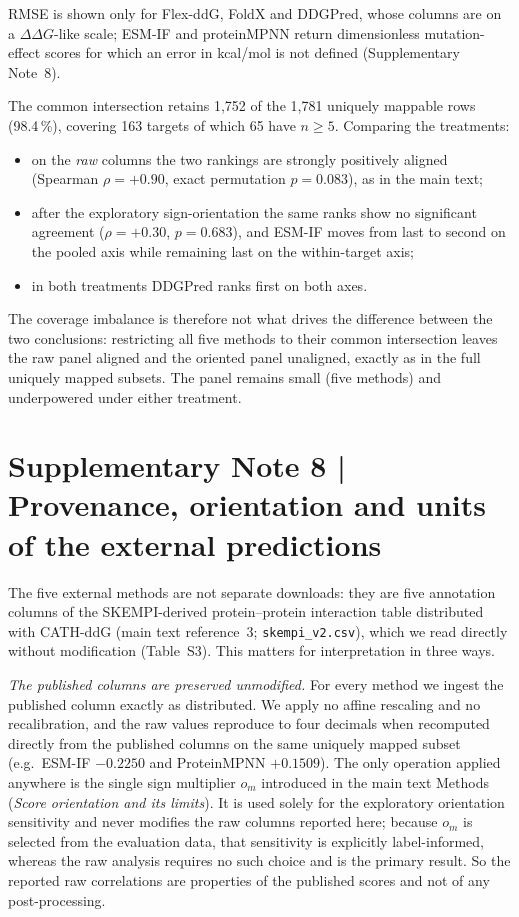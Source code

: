 \documentclass[11pt,a4paper]{article}
\begin{document}
RMSE is shown only for Flex-ddG, FoldX and DDGPred, whose columns are on a $\Delta\Delta G$-like
scale; ESM-IF and proteinMPNN return dimensionless mutation-effect scores for which an error in
kcal/mol is not defined (Supplementary Note~8).

The common intersection retains 1,752 of the 1{,}781 uniquely mappable rows (98.4\,\%),
covering 163 targets of which 65 have $n \geq 5$. Comparing the treatments:

\begin{itemize}
  \item on the \emph{raw} columns the two rankings are strongly positively aligned
        (Spearman $\rho = +0.90$, exact permutation $p = 0.083$), as in the main text;
  \item after the exploratory sign-orientation the same ranks show no significant agreement
        ($\rho = +0.30$, $p = 0.683$), and ESM-IF moves from last to second on the
        pooled axis while remaining last on the within-target axis;
  \item in both treatments DDGPred ranks first on both axes.
\end{itemize}

The coverage imbalance is therefore not what drives the difference between the two conclusions:
restricting all five methods to their common intersection leaves the raw panel aligned and the
oriented panel unaligned, exactly as in the full uniquely mapped subsets. The panel remains small
(five methods) and underpowered under either treatment.

\section*{Supplementary Note 8 | Provenance, orientation and units of the external predictions}
The five external methods are not separate downloads: they are five annotation columns of the
SKEMPI-derived protein--protein interaction table distributed with CATH-ddG (main text
reference~3; \texttt{skempi\_v2.csv}), which we read directly without modification
(Table~S3). This matters for interpretation in three ways.

\emph{The published columns are preserved unmodified.} For every method we ingest the
published column exactly as distributed. We apply no affine rescaling and no recalibration,
and the raw values reproduce to four decimals when recomputed directly from the published
columns on the same uniquely mapped subset (e.g.\ ESM-IF $-0.2250$ and ProteinMPNN
$+0.1509$). The only operation applied anywhere is the single sign multiplier $o_m$
introduced in the main text Methods (\emph{Score orientation and its limits}). It is used
solely for the exploratory
orientation sensitivity and never modifies the raw columns reported here; because $o_m$ is
selected from the evaluation data, that sensitivity is explicitly label-informed, whereas
the raw analysis requires no such choice and is the primary result. So the reported raw
correlations are properties
of the published scores and not of any post-processing.
\end{document}
